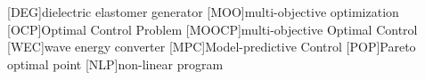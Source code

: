\begin{acronym}
	[DEG]{dielectric elastomer generator}
	[MOO]{multi-objective optimization}
	[OCP]{Optimal Control Problem}
	[MOOCP]{multi-objective Optimal Control}
	[WEC]{wave energy converter}
	[MPC]{Model-predictive Control}
	[POP]{Pareto optimal point}
	[NLP]{non-linear program}
\end{acronym}